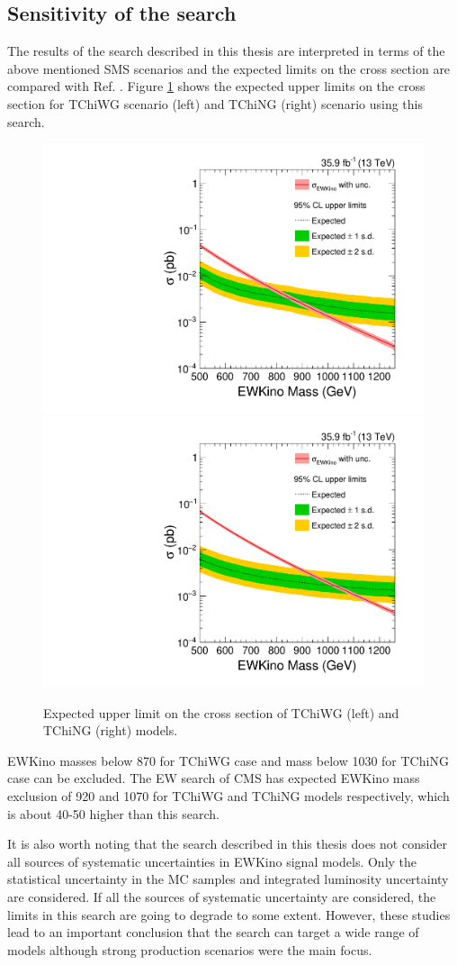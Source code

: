 \subsection{Sensitivity of the search}
The results of the search described in this thesis are interpreted in terms of the above mentioned SMS scenarios and 
the expected limits on the cross section are compared with Ref. \cite{Sirunyan:2017nyt}. Figure \ref{fig:limitPlotter_EW}
shows the expected upper limits on the cross section for TChiWG scenario (left) and TChiNG (right) scenario using this search.

\begin{figure}[h!]
\centering
\includegraphics[width=0.48\linewidth]{../Figures/Chap4/limitPlotter_TChiWG}
\includegraphics[width=0.48\linewidth]{../Figures/Chap4/limitPlotter_TChiNG}
\caption[Expected UL for EW for SUSY]{Expected upper limit on the cross section of TChiWG (left) and TChiNG (right) models.}
\label{fig:limitPlotter_EW}
\end{figure}
EWKino masses below 870 \gev for TChiWG case and mass below 1030 \gev for TChiNG case can be excluded. 
The EW search of CMS \cite{Sirunyan:2017nyt} has expected 
EWKino mass exclusion of 920 \gev and 1070 \gev for TChiWG and TChiNG models respectively, which is about 40-50 \gev higher than
this search. 

It is also worth noting that the search described in this thesis does not consider all sources of systematic uncertainties
in EWKino signal models. Only the statistical uncertainty in the MC samples and integrated luminosity uncertainty are considered.
If all the sources of systematic uncertainty are considered, the limits in this search are going to degrade to some extent. However,
these studies lead to an important conclusion that the search can target a wide range of models although strong production scenarios
were the main focus.

